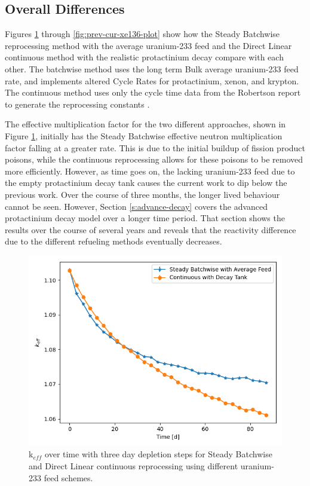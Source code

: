 \subsection{Overall Differences}

Figures \ref{fig:prev-cur-keff-plot} through  \ref{fig:prev-cur-xe136-plot} show how the Steady Batchwise reprocessing method with the average uranium-233 feed and the Direct Linear continuous method with the realistic protactinium decay compare with each other.
The batchwise method uses the long term Bulk average uranium-233 feed rate, and implements altered Cycle Rates for protactinium, xenon, and krypton. The continuous method uses only the cycle time data from the Robertson report to generate the reprocessing constants \cite{robertson_conceptual_1971}.

The effective multiplication factor for the two different approaches, shown in Figure \ref{fig:prev-cur-keff-plot}, initially has the Steady Batchwise effective neutron multiplication factor falling at a greater rate.
This is due to the initial buildup of fission product poisons, while the continuous reprocessing allows for these poisons to be removed more efficiently.
However, as time goes on, the lacking uranium-233 feed due to the empty protactinium decay tank causes the current work to dip below the previous work.
Over the course of three months, the longer lived behaviour cannot be seen.
However, Section \ref{s:advance-decay} covers the advanced protactinium decay model over a longer time period.
That section shows the results over the course of several years and reveals that the reactivity difference due to the different refueling methods eventually decreases.

\begin{figure}[H]
  \centering
  \includegraphics[scale=0.7]{images/prev-cur-keff.png}
  \caption{k$_{eff}$ over time with three day depletion steps for Steady Batchwise and Direct Linear continuous reprocessing using different uranium-233 feed schemes.}
   \label{fig:prev-cur-keff-plot}
\end{figure}

